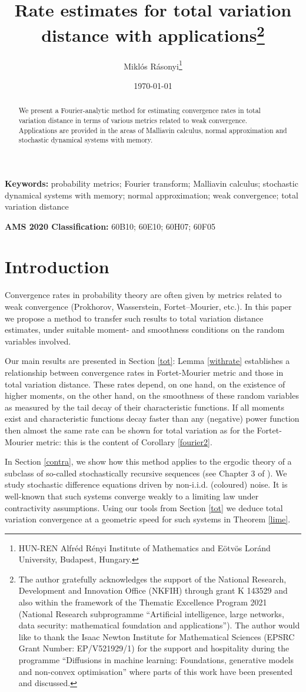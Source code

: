 \documentclass{article}
\title{Rate estimates for total variation distance with applications\thanks{The 
author gratefully acknowledges the support of 
the National Research, Development and Innovation Office (NKFIH) through grant K 143529
and also within the framework of the Thematic Excellence Program 2021 (National Research subprogramme 
``Artificial intelligence, large networks, data security: mathematical foundation and applications'').
The author would like to thank the Isaac Newton Institute for Mathematical
Sciences (EPSRC Grant Number: EP/V521929/1) for the support and hospitality during the programme ``Diffusions in
machine learning: Foundations, generative models and non-convex optimisation''
where parts of this work have been presented and discussed.}}
\author{
Mikl\'os R\'asonyi\thanks{HUN-REN Alfr\'ed R\'enyi Institute of Mathematics and E\"otv\"os Lor\'and University, Budapest, 
Hungary.}}
\date{\today}
\begin{document}
\maketitle{}

\begin{abstract}
{We present a Fourier-analytic method for estimating convergence rates in total variation distance in terms
of various metrics related to weak convergence. Applications are provided in
the areas of Malliavin calculus,
normal approximation and stochastic dynamical systems with memory.}
\end{abstract}

\noindent\textbf{Keywords:} probability metrics; Fourier transform; Malliavin calculus; 
stochastic dynamical systems with memory; normal approximation; weak convergence; total variation distance

\noindent\textbf{AMS 2020 Classification:} 60B10; 60E10; 60H07; 60F05


\section{Introduction}

Convergence rates in probability theory are often given by metrics related to weak convergence (Prokhorov,
Wasserstein, Fortet--Mourier, etc.). In this paper we propose a method to 
transfer such results to total variation distance estimates, under suitable moment- and
smoothness conditions on the random variables involved. 

Our main results are
presented in Section \ref{tot}: Lemma \ref{withrate} establishes a relationship between
convergence rates in Fortet-Mourier metric and those in total variation distance. These rates
depend, on one hand, on the existence of higher moments, on the other hand, on the 
smoothness of these random variables as measured by the tail decay of their characteristic functions.
If all moments exist and characteristic functions decay faster than any (negative) power function then
almost the same rate can be shown for total variation as for the Fortet-Mourier metric: this is the 
content of Corollary \ref{fourier2}.

In Section \ref{contra}, we show how this method applies to the ergodic theory of 
a subclass of so-called stochastically recursive sequences (see Chapter 3 of \cite{borovkov}).
We study stochastic difference equations driven by non-i.i.d. (coloured) noise.
It is well-known that such systems converge weakly to a limiting law under contractivity assumptions.
Using our tools from Section \ref{tot} we deduce total variation convergence at a geometric speed for
such systems in Theorem \ref{lime}.
\end{document}
